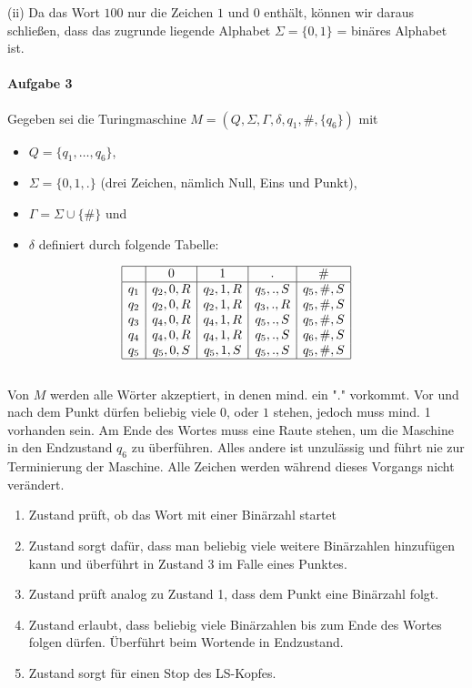 \documentclass[12pt, letterpaper]{article}
\begin{document}
\noindent (ii) Da das Wort \(100\) nur die Zeichen \(1\) und \(0\) enthält, können wir daraus schließen, dass das zugrunde liegende Alphabet \(\Sigma = \{0, 1\}\) = binäres Alphabet ist.


\paragraph{Aufgabe 3}

Gegeben sei die Turingmaschine $M = (Q, \Sigma, \Gamma, \delta, q_1, \# , \{q_6\})$ mit
\begin{itemize}
    \item $Q = \{q_1, \ldots, q_6\}$,
    \item $\Sigma = \{0, 1, .\}$ (drei Zeichen, nämlich Null, Eins und Punkt),
    \item $\Gamma = \Sigma \cup \{\#\}$ und
    \item $\delta$ definiert durch folgende Tabelle:
\end{itemize}

\[
\begin{array}{|c|c|c|c|c|}
\hline
   & 0 & 1 & . & \# \\
  \hline
  q_1 & q_2, 0, R & q_2, 1, R & q_5, ., S & q_5, \#, S \\
  q_2 & q_2, 0, R & q_2, 1, R & q_3, ., R & q_5, \#, S \\
  q_3 & q_4, 0, R & q_4, 1, R & q_5, ., S & q_5, \#, S \\
  q_4 & q_4, 0, R & q_4, 1, R & q_5, ., S & q_6, \#, S \\
  q_5 & q_5, 0, S & q_5, 1, S & q_5, ., S & q_5, \#, S \\
  \hline
\end{array}
\]\\


\noindent Von $M$ werden alle Wörter akzeptiert, in denen mind. ein "." vorkommt. Vor und nach dem Punkt dürfen beliebig viele $0$, oder $1$ stehen, jedoch muss mind. 1 vorhanden sein. Am Ende des Wortes muss eine Raute stehen, um die Maschine in den Endzustand $q_6$ zu überführen. Alles andere ist unzulässig und führt nie zur Terminierung der Maschine. Alle Zeichen werden während dieses Vorgangs nicht verändert.

\begin{enumerate}
    \item Zustand prüft, ob das Wort mit einer Binärzahl startet
    \item Zustand sorgt dafür, dass man beliebig viele weitere Binärzahlen hinzufügen kann und überführt in Zustand 3 im Falle eines Punktes.
    \item Zustand prüft analog zu Zustand 1, dass dem Punkt eine Binärzahl folgt.
    \item Zustand erlaubt, dass beliebig viele Binärzahlen bis zum Ende des Wortes folgen dürfen. Überführt beim Wortende in Endzustand.
    \item Zustand sorgt für einen Stop des LS-Kopfes.
\end{enumerate}
\end{document}
